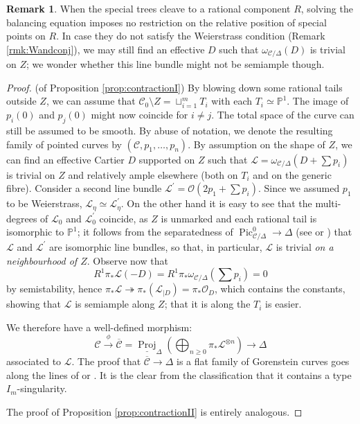 \documentclass[11pt]{amsart}
\newcommand{\PP}{\mathbb P}
\newcommand{\OO}{\mathcal O}
\renewcommand{\to}{\rightarrow}
\newcommand{\dvr}{\Delta}
\newcommand{\Pic}{\operatorname{Pic}}
\theoremstyle{plain}
\theoremstyle{definition}
\newtheorem{rem}[thm]{Remark}
\begin{document}
\begin{rem}\label{rmk:extra_conjugate}
When the special trees cleave to a rational component $R$, solving the balancing equation imposes no restriction on the relative position of special points on $R$. In case they do not satisfy the Weierstrass condition (Remark \ref{rmk:Wandconj}), we may still find an effective $D$ such that $\omega_{\mathcal C/\dvr}(D)$ is trivial on $Z$; we wonder whether this line bundle might not be semiample though.
\end{rem}


\begin{proof}(of Proposition \ref{prop:contractionI})
 By blowing down some rational tails outside $Z$, we can assume that $\mathcal C_0\setminus Z=\sqcup_{i=1}^m T_i$ with each $T_i\simeq\PP^1$. The image of $p_i(0)$ and $p_j(0)$ might now coincide for $i\neq j$. The total space of the curve can still be assumed to be smooth. By abuse of notation, we denote the resulting family of pointed curves by $(\mathcal C,p_1,\ldots,p_n)$. By assumption on the shape of $Z$, we can find an effective Cartier $D$ supported on $Z$ such that $\mathcal L=\omega_{\mathcal C/\dvr}(D+\sum p_i)$ is trivial on $Z$ and relatively ample elsewhere (both on $T_i$ and on the generic fibre). Consider a second line bundle $\mathcal L^\prime=\OO(2p_1+\sum p_i)$. Since we assumed $p_1$ to be Weierstrass, $\mathcal L_\eta\simeq\mathcal L^\prime_\eta$. On the other hand it is easy to see that the multi-degrees of $\mathcal L_0$ and $\mathcal L^\prime_0$ coincide, as $Z$ is unmarked and each rational tail is isomorphic to $\PP^1$; it follows from the separatedness of $\Pic^0_{\mathcal C/\dvr}\to\dvr$ (see \cite[p. 136]{Deligne-Gabber} or \cite[\S 9.4]{BLR}) that $\mathcal L$ and $\mathcal L^\prime$ are isomorphic line bundles, so that, in particular, $\mathcal L$ is trivial \emph{on a neighbourhood of $Z$}. Observe now that 
 \[R^1\pi_*\mathcal L(-D)= R^1\pi_*\omega_{\mathcal C/\dvr}(\sum p_i)=0\]
 by semistability, hence $\pi_*\mathcal L\twoheadrightarrow \pi_*(\mathcal L_{|D})=\pi_*\OO_D$, which contains the constants, showing that $\mathcal L$ is semiample along $Z$; that it is along the $T_i$ is easier.
 
 We therefore have a well-defined  morphism:
 \[\mathcal C\xrightarrow{\phi}\overline{\mathcal C}=\underline{\operatorname{Proj}}_\dvr\left(\bigoplus_{n\geq 0}\pi_*\mathcal L^{\otimes n}\right)\to\dvr\]
 associated to $\mathcal L$. The proof that $\overline{\mathcal C}\to \dvr$ is a flat family of Gorenstein curves goes along the lines of \cite[Lemma 2.13]{SMY1} or \cite[Proposition 3.7.3.1]{RSPW1}. It is the clear from the classification that it contains a type $I_m$-singularity.
 
 The proof of Proposition \ref{prop:contractionII} is entirely analogous.
\end{proof}
\end{document}
